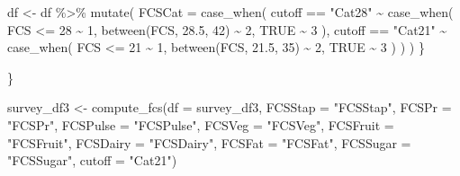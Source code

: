 \documentclass[
  letterpaper,
  DIV=11,
  numbers=noendperiod]{scrreprt}
\newenvironment{Shaded}{\begin{snugshade}}{\end{snugshade}}
\newcommand{\AttributeTok}[1]{\textcolor[rgb]{0.40,0.45,0.13}{#1}}
\newcommand{\ConstantTok}[1]{\textcolor[rgb]{0.56,0.35,0.01}{#1}}
\newcommand{\DecValTok}[1]{\textcolor[rgb]{0.68,0.00,0.00}{#1}}
\newcommand{\FloatTok}[1]{\textcolor[rgb]{0.68,0.00,0.00}{#1}}
\newcommand{\FunctionTok}[1]{\textcolor[rgb]{0.28,0.35,0.67}{#1}}
\newcommand{\NormalTok}[1]{\textcolor[rgb]{0.00,0.23,0.31}{#1}}
\newcommand{\OtherTok}[1]{\textcolor[rgb]{0.00,0.23,0.31}{#1}}
\newcommand{\SpecialCharTok}[1]{\textcolor[rgb]{0.37,0.37,0.37}{#1}}
\newcommand{\StringTok}[1]{\textcolor[rgb]{0.13,0.47,0.30}{#1}}
\begin{document}
\begin{Shaded}
\begin{Highlighting}[]
\NormalTok{    df }\OtherTok{\textless{}{-}}\NormalTok{ df }\SpecialCharTok{\%\textgreater{}\%}
      \FunctionTok{mutate}\NormalTok{(}
        \AttributeTok{FCSCat =} \FunctionTok{case\_when}\NormalTok{(}
\NormalTok{          cutoff }\SpecialCharTok{==} \StringTok{"Cat28"} \SpecialCharTok{\textasciitilde{}} \FunctionTok{case\_when}\NormalTok{(}
\NormalTok{            FCS }\SpecialCharTok{\textless{}=} \DecValTok{28} \SpecialCharTok{\textasciitilde{}} \DecValTok{1}\NormalTok{,}
            \FunctionTok{between}\NormalTok{(FCS, }\FloatTok{28.5}\NormalTok{, }\DecValTok{42}\NormalTok{) }\SpecialCharTok{\textasciitilde{}} \DecValTok{2}\NormalTok{,}
            \ConstantTok{TRUE} \SpecialCharTok{\textasciitilde{}} \DecValTok{3}
\NormalTok{          ),}
\NormalTok{          cutoff }\SpecialCharTok{==} \StringTok{"Cat21"} \SpecialCharTok{\textasciitilde{}} \FunctionTok{case\_when}\NormalTok{(}
\NormalTok{            FCS }\SpecialCharTok{\textless{}=} \DecValTok{21} \SpecialCharTok{\textasciitilde{}} \DecValTok{1}\NormalTok{,}
            \FunctionTok{between}\NormalTok{(FCS, }\FloatTok{21.5}\NormalTok{, }\DecValTok{35}\NormalTok{) }\SpecialCharTok{\textasciitilde{}} \DecValTok{2}\NormalTok{,}
            \ConstantTok{TRUE} \SpecialCharTok{\textasciitilde{}} \DecValTok{3}
\NormalTok{          )}
\NormalTok{        )}
\NormalTok{      )}
\NormalTok{  \}}
  
\NormalTok{\}}
\end{Highlighting}
\end{Shaded}

\begin{Shaded}
\begin{Highlighting}[]
\NormalTok{survey\_df3 }\OtherTok{\textless{}{-}} \FunctionTok{compute\_fcs}\NormalTok{(}\AttributeTok{df =}\NormalTok{ survey\_df3,}
                          \AttributeTok{FCSStap =} \StringTok{"FCSStap"}\NormalTok{,}
                          \AttributeTok{FCSPr =} \StringTok{"FCSPr"}\NormalTok{,}
                          \AttributeTok{FCSPulse =} \StringTok{"FCSPulse"}\NormalTok{,}
                          \AttributeTok{FCSVeg =} \StringTok{"FCSVeg"}\NormalTok{,}
                          \AttributeTok{FCSFruit =} \StringTok{"FCSFruit"}\NormalTok{,}
                          \AttributeTok{FCSDairy =} \StringTok{"FCSDairy"}\NormalTok{,}
                          \AttributeTok{FCSFat =} \StringTok{"FCSFat"}\NormalTok{,}
                          \AttributeTok{FCSSugar =} \StringTok{"FCSSugar"}\NormalTok{,}
                          \AttributeTok{cutoff =} \StringTok{"Cat21"}\NormalTok{)}
\end{Highlighting}
\end{Shaded}
\end{document}
